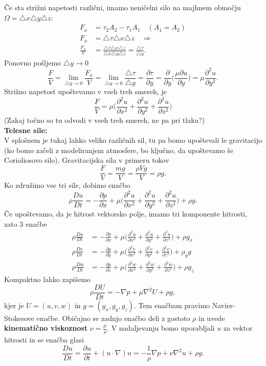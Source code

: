 \documentclass[mat2, tisk]{fmfdelo}
\begin{document}
Če sta strižni napetosti različni, imamo neničelni silo na majhnem območju $\Omega = \triangle x \triangle y \triangle z$:
\begin{align*}
F_x &= \tau_2 A_2 - \tau_1 A_1  \quad (A_1 = A_2)\\
F_x &= \triangle \tau \triangle x \triangle z  \quad \Longrightarrow\\
\frac{F_x}{V} &= \frac{\triangle \tau \triangle x \triangle z}{\triangle x \triangle y \triangle z} = \frac{\triangle \tau}{\triangle y}.
\end{align*}
Ponovno pošljemo $\triangle y \rightarrow 0$
$$
\frac{F}{V} = \lim_{\triangle y \rightarrow 0} \frac{F_x}{V} = \lim_{\triangle y \rightarrow 0} \frac{\triangle \tau}{\triangle y} = \frac{\partial \tau}{\partial y} = \frac{\partial}{\partial y} \Big(\frac{\mu\partial u}{\partial y} \Big) = \mu \frac{\partial^2 u}{\partial y^2}.
$$
Strižno napetost upoštevamo v vseh treh smereh, je
$$
\frac{F}{V} = \mu \Big(\frac{\partial^2 u}{\partial x^2} + \frac{\partial^2 u}{\partial y^2} + \frac{\partial^2 u}{\partial z^2}  \Big)
$$
(Zakaj točno so tu odvodi v vseh treh smereh, ne pa pri tlaku?) \\[1mm]
\textbf{Telesne sile:} \\
V splošnem je tukaj lahko veliko različnih sil, tu pa bomo upoštevali le gravitacijo (ko bomo začeli z modeliranjem atmosfere, bo ključno, da upoštevamo še Corioliosovo silo). Gravitacijska sila v primeru tokov 
$$
\frac{F}{V} = \frac{m g}{V} = \frac{\rho V g}{V} = \rho g.
$$
Ko združimo vse tri sile, dobimo enačbo
$$
\rho \frac{D u}{D t} = - \frac{\partial p}{\partial x} + \mu \Big( \frac{\partial^2 u}{\partial x^2} + \frac{\partial^2 u}{\partial y^2} + \frac{\partial^2 u}{\partial z^2} \Big) + \rho g.
$$
Če upoštevamo, da je hitrost vektorsko polje, imamo tri komponente hitrosti, zato $3$ enačbe 
\begin{align*}
  \rho \frac{D u}{D t} &= - \frac{\partial p}{\partial x} + \mu \Big( \frac{\partial^2 u}{\partial x^2} + \frac{\partial^2 u}{\partial y^2} + \frac{\partial^2 u}{\partial z^2} \Big) + \rho g_x \\
  \rho \frac{D v}{D t} &= - \frac{\partial p}{\partial y} + \mu \Big( \frac{\partial^2 v}{\partial x^2} + \frac{\partial^2 v}{\partial y^2} + \frac{\partial^2 v}{\partial z^2} \Big) + \rho_y g\\
  \rho \frac{D w}{D t} &= - \frac{\partial p}{\partial z} + \mu \Big( \frac{\partial^2 w}{\partial x^2} + \frac{\partial^2 w}{\partial y^2} + \frac{\partial^2 w}{\partial z^2} \Big) + \rho g_z
\end{align*}
Kompaktno lahko zapišemo 
$$
\rho \frac{D U}{D t} = - \nabla p + \mu \nabla^2 U + \rho g,
$$
kjer je $U = (u, v, w)$ in $g = (g_x, g_y, g_z)$. Tem enačbam pravimo Navier-Stokesove enačbe.
Običajno se zadnjo enačbo deli z gostoto $\rho$ in uvede \textbf{kinematično viskoznost}
$\nu = \frac{\mu}{\rho}$. V nadaljevanju bomo uporabljali $u$ za vektor hitrosti in se enačba
glasi
\begin{equation}
  \label{NS}
\frac{D u}{D t} = \frac{\partial u}{\partial t} + (u\cdot \nabla)u = - \frac{1}{\rho}\nabla p + \nu \nabla^2 u + \rho g.
\end{equation}
\end{document}
